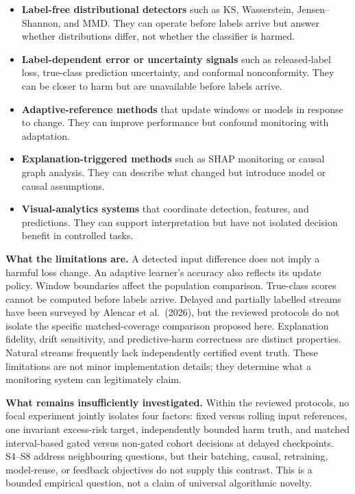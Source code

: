 \documentclass[
]{article}
\providecommand{\tightlist}{%
  \setlength{\itemsep}{0pt}\setlength{\parskip}{0pt}}
\begin{document}
\begin{itemize}
\tightlist
\item
  \textbf{Label-free distributional detectors} such as KS, Wasserstein,
  Jensen--Shannon, and MMD. They can operate before labels arrive but
  answer whether distributions differ, not whether the classifier is
  harmed.
\item
  \textbf{Label-dependent error or uncertainty signals} such as
  released-label loss, true-class prediction uncertainty, and conformal
  nonconformity. They can be closer to harm but are unavailable before
  labels arrive.
\item
  \textbf{Adaptive-reference methods} that update windows or models in
  response to change. They can improve performance but confound
  monitoring with adaptation.
\item
  \textbf{Explanation-triggered methods} such as SHAP monitoring or
  causal graph analysis. They can describe what changed but introduce
  model or causal assumptions.
\item
  \textbf{Visual-analytics systems} that coordinate detection, features,
  and predictions. They can support interpretation but have not isolated
  decision benefit in controlled tasks.
\end{itemize}

\textbf{What the limitations are.} A detected input difference does not
imply a harmful loss change. An adaptive learner's accuracy also
reflects its update policy. Window boundaries affect the population
comparison. True-class scores cannot be computed before labels arrive.
Delayed and partially labelled streams have been surveyed by Alencar et
al.~(2026), but the reviewed protocols do not isolate the specific
matched-coverage comparison proposed here. Explanation fidelity, drift
sensitivity, and predictive-harm correctness are distinct properties.
Natural streams frequently lack independently certified event truth.
These limitations are not minor implementation details; they determine
what a monitoring system can legitimately claim.

\textbf{What remains insufficiently investigated.} Within the reviewed
protocols, no focal experiment jointly isolates four factors: fixed
versus rolling input references, one invariant excess-risk target,
independently bounded harm truth, and matched interval-based gated
versus non-gated cohort decisions at delayed checkpoints. S4--S8 address
neighbouring questions, but their batching, causal, retraining,
model-reuse, or feedback objectives do not supply this contrast. This is
a bounded empirical question, not a claim of universal algorithmic
novelty.
\end{document}

